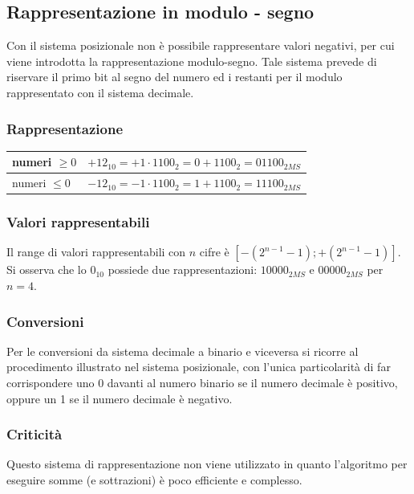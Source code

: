 \documentclass{article}
\begin{document}
\subsection{Rappresentazione in modulo - segno}
Con il sistema posizionale non è possibile rappresentare valori negativi, per cui viene introdotta la rappresentazione
modulo-segno. Tale sistema prevede di riservare il primo bit al segno del numero ed i restanti per il modulo rappresentato
con il sistema decimale. 

\subsubsection*{Rappresentazione}
\begin{center}
	\begin{tabularx}{\textwidth}{l X}
		numeri \(\geq 0\) & \(+12_{10} = +1 \cdot 1100_2 = 0 + 1100_2 = 01100_{2MS}\) \\
		\midrule
		numeri \(\leq 0\) & \(-12_{10} = -1 \cdot 1100_2 = 1 + 1100_2 = 11100_{2MS}\)
	\end{tabularx}
\end{center}

\subsubsection*{Valori rappresentabili}
Il range di valori rappresentabili con \(n\) cifre è \(\left[- \left(2^{n - 1} - 1\right); + \left(2^{n - 1} - 1\right) \right]\). \\
Si osserva che lo \(0_{10}\) possiede due rappresentazioni: \(1 0000_{2MS}\) e \(0 0000_{2MS}\)  per \(n = 4\).
		
\subsubsection*{Conversioni}
Per le conversioni da sistema decimale a binario e viceversa si ricorre al procedimento illustrato nel sistema posizionale,
con l'unica particolarità di far corrispondere uno 0 davanti al numero binario se il numero decimale è positivo, oppure un 1
se il numero decimale è negativo.

\subsubsection*{Criticità}
Questo sistema di rappresentazione non viene utilizzato in quanto l'algoritmo per eseguire somme (e sottrazioni) è poco
efficiente e complesso.
\end{document}
